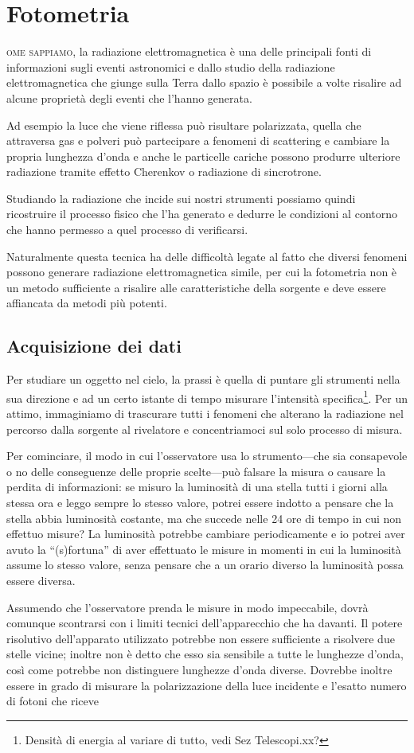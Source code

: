 \chapter{Fotometria}\label{ch:fotometria}
    \textsc{ome sappiamo}, la radiazione elettromagnetica è una delle principali fonti di informazioni sugli eventi astronomici e dallo studio della radiazione elettromagnetica che giunge sulla Terra dallo spazio è possibile a volte risalire ad alcune proprietà degli eventi che l'hanno generata.

    Ad esempio la luce che viene riflessa può risultare polarizzata, quella che attraversa gas e polveri può partecipare a fenomeni di scattering e cambiare la propria lunghezza d'onda e anche le particelle cariche possono produrre ulteriore radiazione tramite effetto Cherenkov o radiazione di sincrotrone.

    Studiando la radiazione che incide sui nostri strumenti possiamo quindi ricostruire il processo fisico che l'ha generato e dedurre le condizioni al contorno che hanno permesso a quel processo di verificarsi.

    Naturalmente questa tecnica ha delle difficoltà legate al fatto che diversi fenomeni possono generare radiazione elettromagnetica simile, per cui la fotometria non è un metodo sufficiente a risalire alle caratteristiche della sorgente e deve essere affiancata da metodi più potenti.
    \section{Acquisizione dei dati}
        Per studiare un oggetto nel cielo, la prassi è quella di puntare gli strumenti nella sua direzione e ad un certo istante di tempo misurare l'intensità specifica\footnote{Densità di energia al variare di tutto, vedi Sez Telescopi.xx?}. Per un attimo, immaginiamo di trascurare tutti i fenomeni che alterano la radiazione nel percorso dalla sorgente al rivelatore e concentriamoci sul solo processo di misura.

        Per cominciare, il modo in cui l'osservatore usa lo strumento---che sia consapevole o no delle conseguenze delle proprie scelte---può falsare la misura o causare la perdita di informazioni: se misuro la luminosità di una stella tutti i giorni alla stessa ora e leggo sempre lo stesso valore, potrei essere indotto a pensare che la stella abbia luminosità costante, ma che succede nelle 24 ore di tempo in cui non effettuo misure? La luminosità potrebbe cambiare periodicamente e io potrei aver avuto la ``(s)fortuna'' di aver effettuato le misure in momenti in cui la luminosità assume lo stesso valore, senza pensare che a un orario diverso la luminosità possa essere diversa.

        Assumendo che l'osservatore prenda le misure in modo impeccabile, dovrà comunque scontrarsi con i limiti tecnici dell'apparecchio che ha davanti. Il potere risolutivo dell'apparato utilizzato potrebbe non essere sufficiente a risolvere due stelle vicine; inoltre non è detto che esso sia sensibile a tutte le lunghezze d'onda, così come potrebbe non distinguere lunghezze d'onda diverse. Dovrebbe inoltre essere in grado di misurare la polarizzazione della luce incidente e l'esatto numero di fotoni che riceve